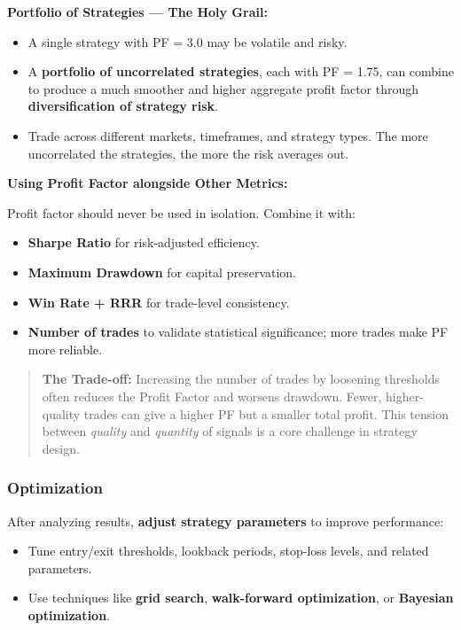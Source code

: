 \documentclass[12pt,openany]{book}
\begin{document}
\textbf{Portfolio of Strategies --- The Holy Grail:}
\begin{itemize}[leftmargin=*]
    \item A single strategy with PF = 3.0 may be volatile and risky.
    \item A \textbf{portfolio of uncorrelated strategies}, each with PF = 1.75, can combine to produce a much smoother and higher aggregate profit factor through \textbf{diversification of strategy risk}.
    \item Trade across different markets, timeframes, and strategy types. The more uncorrelated the strategies, the more the risk averages out.
\end{itemize}

\textbf{Using Profit Factor alongside Other Metrics:}

Profit factor should never be used in isolation. Combine it with:
\begin{itemize}[leftmargin=*]
    \item \textbf{Sharpe Ratio} for risk-adjusted efficiency.
    \item \textbf{Maximum Drawdown} for capital preservation.
    \item \textbf{Win Rate + RRR} for trade-level consistency.
    \item \textbf{Number of trades} to validate statistical significance; more trades make PF more reliable.
\end{itemize}

\begin{quote}
    \textbf{The Trade-off:} Increasing the number of trades by loosening thresholds often reduces the Profit Factor and worsens drawdown. Fewer, higher-quality trades can give a higher PF but a smaller total profit. This tension between \emph{quality} and \emph{quantity} of signals is a core challenge in strategy design.
\end{quote}

\subsubsection{Optimization}

After analyzing results, \textbf{adjust strategy parameters} to improve performance:
\begin{itemize}[leftmargin=*]
    \item Tune entry/exit thresholds, lookback periods, stop-loss levels, and related parameters.
    \item Use techniques like \textbf{grid search}, \textbf{walk-forward optimization}, or \textbf{Bayesian optimization}.
\end{itemize}
\end{document}
